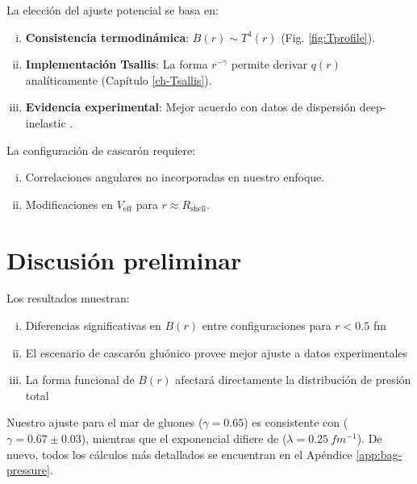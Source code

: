 
\begin{remark}
    La elección del ajuste potencial se basa en:
    \begin{enumerate}[i.]
        \item \textbf{Consistencia termodinámica}: $B(r) \sim T^4(r)$ (Fig. \ref{fig:Tprofile}).
        \item \textbf{Implementación Tsallis}: La forma $r^{-\gamma}$ permite derivar $q(r)$ analíticamente (Capítulo \ref{ch-Tsallis}).
        \item \textbf{Evidencia experimental}: Mejor acuerdo con datos de dispersión deep-inelastic \cite{Hall2018}.
    \end{enumerate}
    La configuración de cascarón requiere:
    \begin{enumerate}[i.]
        \item Correlaciones angulares no incorporadas en nuestro enfoque.
        \item Modificaciones en $V_{\text{eff}}$ para $r \approx R_{\text{shell}}$.
    \end{enumerate}
\end{remark}

\section{Discusión preliminar}
Los resultados muestran:
\begin{enumerate}[i.]
    \item Diferencias significativas en $B(r)$ entre configuraciones para $r < 0.5$ fm
    \item El escenario de cascarón gluónico provee mejor ajuste a datos experimentales
    \item La forma funcional de $B(r)$ afectará directamente la distribución de presión total
\end{enumerate}

Nuestro ajuste para el mar de gluones ($\gamma=0.65$) es consistente con \cite{Burkert2020} ($\gamma=0.67 \pm 0.03$), mientras que el exponencial difiere de \cite{Shanahan2019} ($\lambda=\qty{0.25}{fm^{-1}}$). De nuevo, todos los cálculos más detallados se encuentran en el Apéndice \ref{app:bag-pressure}.

